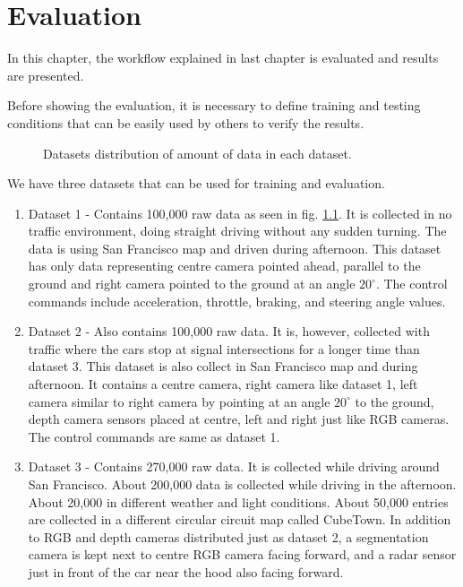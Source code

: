 \chapter{Evaluation}
In this chapter, the workflow explained in last chapter is evaluated and results are
presented.

Before showing the evaluation, it is necessary to define training and testing conditions
that can be easily used by others to verify the results.
\begin{figure}[!ht]
    \centering
    \def\svgwidth{0.3\textwidth}
    
    \caption{Datasets distribution of amount of data in each dataset.}
    \label{fig:datasetsdistribution}
\end{figure}

We have three datasets that can be used for training and evaluation.
\begin{enumerate}
    \item Dataset 1 - Contains 100,000 raw data as seen in fig. \ref{fig:datasetsdistribution}. It is collected in no traffic
        environment, doing straight driving without any sudden turning. The data is using
        San Francisco map and driven during afternoon. This dataset has only data
        representing centre camera pointed ahead, parallel to the ground and right camera
        pointed to the ground at an angle $20^{\circ}$. The control commands include
        acceleration, throttle, braking, and steering angle values. \label{chapter05list:ds1}
    \item Dataset 2 - Also contains 100,000 raw data. It is, however, collected with traffic
        where the cars stop at signal intersections for a longer time than dataset 3. This
        dataset is also collect in San Francisco map and during afternoon. It contains a
        centre camera, right camera like dataset 1, left camera similar to right camera by
        pointing at an angle $20^{\circ}$ to the ground, depth camera sensors placed at
        centre, left and right just like RGB cameras. The control commands are same as
        dataset 1.
    \item Dataset 3 - Contains 270,000 raw data. It is collected while driving around San
        Francisco. About 200,000 data is collected while driving in the afternoon. About
        20,000 in different weather and light conditions. About 50,000 entries are
        collected in a different circular circuit map called CubeTown. In addition to RGB
        and depth cameras distributed just as dataset 2, a segmentation camera is kept
        next to centre RGB camera facing forward, and a radar sensor just in front of the
        car near the hood also facing forward.

\end{enumerate}

